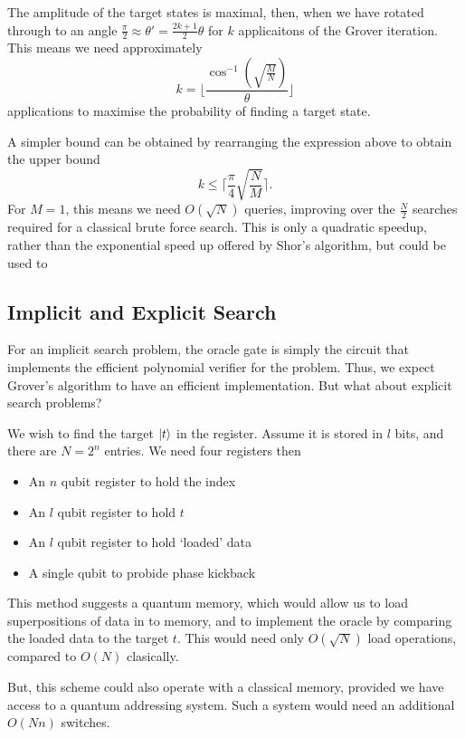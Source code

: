 \documentclass[11pt]{article}
\begin{document}
The amplitude of the target states is maximal, then, when we have rotated through to an angle $\frac{\pi}{2}\approx\theta'=\frac{2k+1}{2}\theta$ for $k$ applicaitons of the Grover iteration. This means we need approximately
\begin{equation}
    k=\lfloor \frac{\cos^{-1}(\sqrt{\frac{M}{N}})}{\theta} \rfloor
\end{equation}
applications to maximise the probability of finding a target state.

A simpler bound can be obtained by rearranging the expression above to obtain the upper bound
\begin{equation}
    k \leq \lceil \frac{\pi}{4}\sqrt{\frac{N}{M}} \rceil.
\end{equation}
For $M=1$, this means we need $O(\sqrt{N})$ queries, improving over the $\frac{N}{2}$ searches required for a classical brute force search. This is only a quadratic speedup, rather than the exponential speed up offered by Shor's algorithm, but could be used to

\subsection*{Implicit and Explicit Search}
For an implicit search problem, the oracle gate is simply the circuit that implements the efficient polynomial verifier for the problem. Thus, we expect Grover's algorithm to have an efficient implementation. But what about explicit search problems?

We wish to find the target $\ket{t}$ in the register. Assume it is stored in $l$ bits, and there are $N=2^{n}$ entries. We need four registers then
\begin{itemize}
    \item An $n$ qubit register to hold the index
    \item An $l$ qubit register to hold $t$
    \item An $l$ qubit register to hold `loaded' data
    \item A single qubit to probide phase kickback
\end{itemize}

This method suggests a quantum memory, which would allow us to load superpositions of data in to memory, and to implement the oracle by comparing the loaded data to the target $t$. This would need only $O(\sqrt{N})$ load operations, compared to $O(N)$ clasically.

But, this scheme could also operate with a classical memory, provided we have access to a quantum addressing system. Such a system would need an additional $O(Nn)$ switches.
\end{document}
